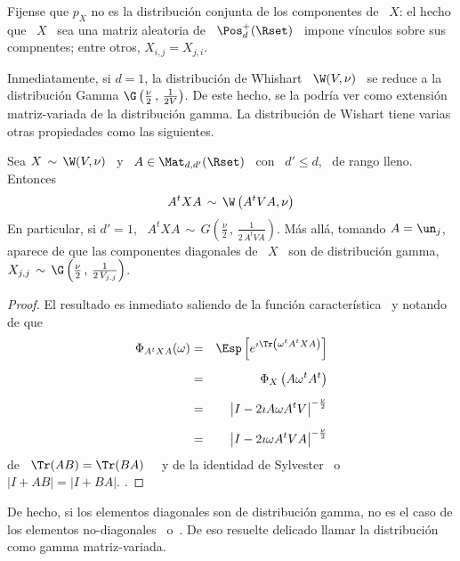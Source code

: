 Fijense que $p_X$ no es la  distribuci\'on conjunta de los componentes de \ $X$:
el hecho  que \  $X$ \  sea una matriz  aleatoria de  \ $\Pos_d^+(\Rset)$  \ impone
v\'inculos sobre sus compnentes; entre otros, $X_{i,j} = X_{j,i}$.

Inmediatamente, si  $d = 1$, la  distribuci\'on de Whishart \  $\W(V,\nu)$ \ se
reduce  a la  distribuci\'on Gamma  $\G\left(\frac{\nu}{2} \,  , \,  \frac1{2 V}
\right)$. De este  hecho, se la podr\'ia ver  como extensi\'on matriz-variada de
la  distribuci\'on  gamma.  La  distribuci\'on  de  Wishart  tiene varias  otras
propiedades como las siguientes.
%
\begin{lema}
\label{Lem:MP:StabilidadWishartLineal}
%
Sea $X \, \sim \, \W(V,\nu)$ \ y  \ $A \in \Mat_{d,d'}(\Rset)$ \ con \ $d' \le d$,
\ de rango lleno. Entonces
  \[
  A^t X A \, \sim \, \W\left( A^t V A , \nu \right)
  \]
  En particular, si $d'  = 1$, \ $A^t X A \, \sim  \, G\left( \frac{\nu}{2} \, ,
    \, \frac1{2 \, A^t V A} \right)$. M\'as all\'a, tomando $A = \un_j$, aparece
  de que  las componentes diagonales de \  $X$ \ son de  distribuci\'on gamma, \
  $X_{j,j}  \, \sim  \,  \G\left( \frac{\nu}{2}  \,  , \,  \frac1{2 \,  V_{j,j}}
  \right)$.
\end{lema}
%
\begin{proof}
  El     resultado     es     inmediato     saliendo     de     la     funci\'on
  caracter\'istica~\footref{Foot:MP:CaracteristicaWishart} y notando de que
%
\begin{eqnarray*}
\Phi_{A^t X A}(\omega) & = & \Esp\left[ e^{\imath \Tr\left( \omega^t A^t X A
\right)}\right]\\[2mm]
%
& = & \Phi_X\left( A \omega^t A^t\right)\\[2mm]
%
& = &  \left| I - 2 \imath A \omega A^t V \right|^{-\frac{\nu}{2}}\\[2mm]
%
& = &  \left| I - 2 \imath \omega A^t V A \right|^{-\frac{\nu}{2}}
%
\end{eqnarray*}
%
de   \   $\Tr(AB)   =   \Tr(BA)$~\cite{Har08}   \   y   de   la   identidad   de
Sylvester~\cite{Syl51,  AkrAkr96}  o~\cite[\S~18.1]{Har08} \  $\left|  I  + A  B
\right| = \left| I + B A \right|$.  .
\end{proof}
%
De hecho, si los elementos diagonales son de distribuci\'on gamma, no es el caso
de         los        elementos         no-diagonales~\cite{Seb04,        And03}
o~\cite[Teo.~3.3.4]{GupNag99}.    De    eso   resuelte   delicado    llamar   la
distribuci\'on como gamma matriz-variada.

